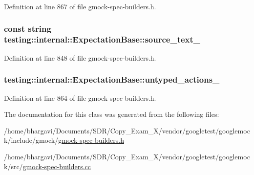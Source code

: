 Definition at line 867 of file gmock-\/spec-\/builders.\+h.

\subsubsection[{\texorpdfstring{source\+\_\+text\+\_\+}{source_text_}}]{\setlength{\rightskip}{0pt plus 5cm}const {\bf string} testing\+::internal\+::\+Expectation\+Base\+::source\+\_\+text\+\_\+\hspace{0.3cm}{\ttfamily [protected]}}\hypertarget{classtesting_1_1internal_1_1_expectation_base_a8803b5fa8354205a6b57e21a704acbef}{}\label{classtesting_1_1internal_1_1_expectation_base_a8803b5fa8354205a6b57e21a704acbef}


Definition at line 848 of file gmock-\/spec-\/builders.\+h.

\subsubsection[{\texorpdfstring{untyped\+\_\+actions\+\_\+}{untyped_actions_}}]{ testing\+::internal\+::\+Expectation\+Base\+::untyped\+\_\+actions\+\_\+\hspace{0.3cm}{\ttfamily [protected]}}\hypertarget{classtesting_1_1internal_1_1_expectation_base_a9558ff6b8b1b7e3a99fac1f93d1826da}{}\label{classtesting_1_1internal_1_1_expectation_base_a9558ff6b8b1b7e3a99fac1f93d1826da}


Definition at line 864 of file gmock-\/spec-\/builders.\+h.



The documentation for this class was generated from the following files\+:\begin{DoxyCompactItemize}
\item 
/home/bhargavi/\+Documents/\+S\+D\+R/\+Copy\+\_\+\+Exam\+\_\+X/vendor/googletest/googlemock/include/gmock/\hyperlink{gmock-spec-builders_8h}{gmock-\/spec-\/builders.\+h}\item 
/home/bhargavi/\+Documents/\+S\+D\+R/\+Copy\+\_\+\+Exam\+\_\+X/vendor/googletest/googlemock/src/\hyperlink{gmock-spec-builders_8cc}{gmock-\/spec-\/builders.\+cc}\end{DoxyCompactItemize}
